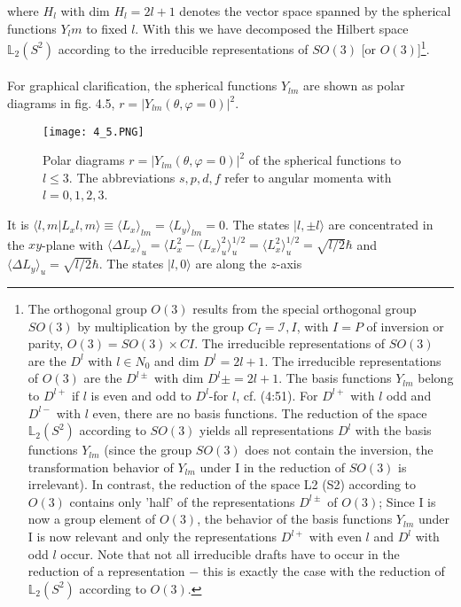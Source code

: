 where $H_l$ with dim $H_l = 2l + 1$ denotes the vector space spanned by the spherical functions $Y_lm$ to fixed $l$. With this we have decomposed the Hilbert space $\mathbb{L}_2(S^2)$ according to the irreducible representations of $SO (3)$ [or $O (3)$]\footnote{The orthogonal group $O (3)$ results from the special orthogonal group $SO (3)$ by multiplication by the group $C_I = {\mathcal{I}, I}$, with $I = P$ of inversion or parity, $O (3) = SO (3 ) × CI$. The irreducible representations of $SO (3)$ are the $D^l$ with $l \in N_0$ and dim $D^l = 2l + 1$. The irreducible representations of $O (3)$ are the $D^{l\pm}$ with dim $D^l \pm = 2l + 1$. The basis functions $Y_{lm}$ belong to $D^{l+}$ if $l$ is even and odd to $D^l$-for $l$, cf. (4:51). For $D^{l+}$ with $l$ odd and $D^{l-}$ with $l$ even, there are no basis functions. The reduction of the space$\mathbb{L}_2(S^2)$ according to $SO (3)$ yields all representations $D^l$ with the basis functions $Y_{lm}$ (since the group $SO (3)$ does not contain the inversion, the transformation behavior of $Y_{lm}$ under I in the reduction of $SO (3)$ is irrelevant). In contrast, the reduction of the space L2 (S2) according to $O (3)$ contains only 'half' of the representations $D^{l\pm}$ of $O (3)$; Since I is now a group element of $O (3)$, the behavior of the basis functions $Y_{lm}$ under I is now relevant and only the representations $D^{l+}$ with even $l$ and $D^l$ with odd $l$ occur. Note that not all irreducible drafts have to occur in the reduction of a representation $-$ this is exactly the case with the reduction of $\mathbb{L}_2(S^2)$ according to $O (3)$.}.\\\\
For graphical clarification, the spherical functions $Y_{lm}$ are shown as polar diagrams in fig. 4.5, $r = | Y_{lm}(\theta, \varphi = 0) |^2$.
\begin{figure}[ht]
    \centering
    \texttt{[image: 4\_5.PNG]}
    \caption{Polar diagrams $r = | Y_{lm} (\theta, \varphi = 0) |^2$ of the spherical functions to $l \leq 3$. The abbreviations $s, p, d, f$ refer to angular momenta with $l = 0, 1, 2, 3$.}
\end{figure}
It is $\langle l, m | L_x l,m\rangle \equiv \langle L_x\rangle_{lm} = \langle L_y\rangle_{lm} = 0$. The states $| l, \pm l\rangle$ are concentrated in the $xy$-plane with $\langle \Delta L_x\rangle_{u} = \langle L^2_x-\langle L_x\rangle^2_{u}\rangle^{1/2}_{u}=\langle L_x^2\rangle^{1/2}_{u}=\sqrt{l/2}\hbar$ and $\langle \Delta L_y\rangle_u=\sqrt{l/2}\hbar$. The states $| l, 0\rangle$ are along the $z$-axis
